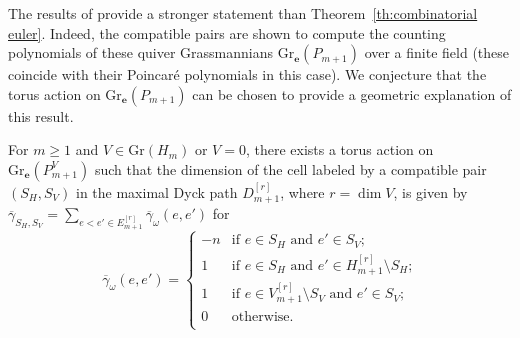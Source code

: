 \documentclass[smallextended,envcountsect,envcountsame]{svjour3}
\numberwithin{equation}{section}
\newcommand{\bfe}{\mathbf{e}}
\newcommand{\Gr}{\mathrm{Gr}}
\begin{document}
The results of \cite{rupel} provide a stronger statement than Theorem~\ref{th:combinatorial euler}.
Indeed, the compatible pairs are shown to compute the counting polynomials of these quiver Grassmannians $\Gr_\bfe(P_{m+1})$ over a finite field (these coincide with their Poincar\'e polynomials in this case).  
We conjecture that the torus action on $\Gr_\bfe(P_{m+1})$ can be chosen to provide a geometric explanation of this result.
\begin{conjecture}
  \label{conj:cell dimensions}
  For $m\ge1$ and $V\in\Gr(H_m)$ or $V=0$, there exists a torus action on $\Gr_\bfe(P_{m+1}^V)$ such that the dimension of the cell labeled by a compatible pair $(S_H,S_V)$ in the maximal Dyck path $D_{m+1}^{[r]}$, where $r=\dim V$, is given by $\overline{\gamma}_{S_H,S_V}=\sum\limits_{e<e'\in E_{m+1}^{[r]}}\overline{\gamma}_\omega(e,e')$ for
  \begin{equation*}
    \overline{\gamma}_\omega(e,e')=
    \begin{cases}
      -n & \text{if $e\in S_H$ and $e'\in S_V$;}\\ 
      1 & \text{if $e\in S_H$ and $e'\in H_{m+1}^{[r]}\setminus S_H$;}\\ 
      1 & \text{if $e\in V_{m+1}^{[r]}\setminus S_V$ and $e'\in S_V$;}\\ 
      0 & \text{otherwise.}\\ 
    \end{cases}
  \end{equation*}
\end{conjecture}
\end{document}
